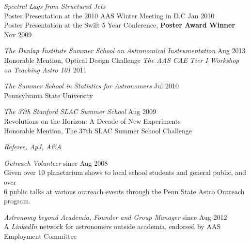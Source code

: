 \begin{small}
\vspace{10pt}
{\sl Spectral Lags from Structured Jets}  \\
Poster Presentation at the 2010 AAS Winter Meeting in D.C \hfill Jan
2010 \\
Poster Presentation at the Swift 5 Year Conference, {\bf Poster Award
  Winner} \hfill Nov 2009


 


{\sl The Dunlap Institute Summer School on Astronomical
  Instrumentation} \hfill Aug 2013 \\
Honorable Mention, Optical Design Challenge
% 
\vspace{10pt}
{\sl The AAS CAE Tier I Workshop on Teaching Astro 101} \hfill 2011 

\vspace{10pt}
{\sl The Summer School in Statistics for Astronomers} \hfill  Jul 2010\\
Pennsylvania State University
% 

\vspace{10pt}
{\sl The 37th Stanford SLAC Summer School} \hfill        Aug 2009  \\
Revolutions on the Horizon: A Decade of New Experiments\\
Honorable Mention, The 37th SLAC Summer School Challenge
% 


\newpage
{} 


{\sl Referee, ApJ, A\&A} 
\vspace{10pt}

{\sl Outreach Volunteer} \hfill  since Aug 2008 \\
Given over 10 planetarium shows to local school students and general public, and over \\
6 public talks at various outreach events through the Penn State Astro
Outreach program. 
\vspace{10pt}

{\sl Astronomy beyond Academia, Founder and Group Manager} \hfill  since Aug 2012 \\
A {\it LinkedIn} network for astronomers outside academia,
endorsed by AAS Employment Committee
\vspace{10pt}


\end{small}

